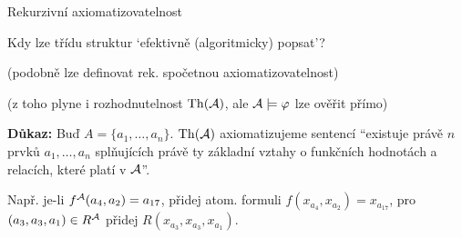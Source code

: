\documentclass{beamer}
\begin{document}
\begin{frame}{Rekurzivní axiomatizovatelnost}

    Kdy lze třídu struktur `efektivně (algoritmicky) popsat'?


    (podobně lze definovat \alert{rek. spočetnou axiomatizovatelnost})

    
    (z toho plyne i rozhodnutelnost $\operatorname{Th}(\mathcal{A})$, ale $\mathcal{A}\models\varphi$ lze ověřit přímo)

    \textbf{Důkaz:}
    Buď $A=\{a_1,\dots,a_n\}$. $\operatorname{Th}(\mathcal{A})$ axiomatizujeme sentencí ``existuje právě $n$ prvků $a_1,\dots,a_n$ splňujících právě ty \alert{základní vztahy} o funkčních hodnotách a relacích, které platí v $\mathcal{A}$''.
    
    Např. je-li $f^{\mathcal{A}}(a_4, a_2)=a_{17}$, přidej atom. formuli $f(x_{a_4},x_{a_2})=x_{a_{17}}$, pro $(a_3,a_3,a_1)\in R^{\mathcal{A}}$ přidej $R(x_{a_3},x_{a_3},x_{a_1})$.\hfill\qedsymbol

\end{frame}
\end{document}
